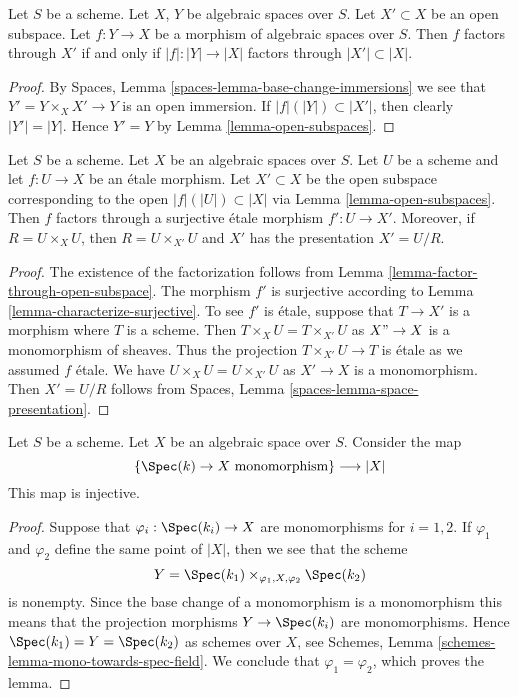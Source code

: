 \begin{lemma}
\label{lemma-factor-through-open-subspace}
Let $S$ be a scheme.
Let $X$, $Y$ be algebraic spaces over $S$.
Let $X' \subset X$ be an open subspace.
Let $f : Y \to X$ be a morphism of algebraic spaces over $S$.
Then $f$ factors through $X'$ if and only if $|f| : |Y| \to |X|$
factors through $|X'| \subset |X|$.
\end{lemma}

\begin{proof}
By Spaces, Lemma \ref{spaces-lemma-base-change-immersions}
we see that $Y' = Y \times_X X' \to Y$ is an open immersion.
If $|f|(|Y|) \subset |X'|$, then clearly $|Y'| = |Y|$. Hence $Y' = Y$ by
Lemma \ref{lemma-open-subspaces}.
\end{proof}

\begin{lemma}
\label{lemma-etale-image-open}
Let $S$ be a scheme. Let $X$ be an algebraic spaces over $S$.
Let $U$ be a scheme and let $f : U \to X$ be an \'etale morphism.
Let $X' \subset X$ be the open subspace corresponding to
the open $|f|(|U|) \subset |X|$ via
Lemma \ref{lemma-open-subspaces}.
Then $f$ factors through a surjective \'etale morphism $f' : U \to X'$.
Moreover, if $R = U \times_X U$, then $R = U \times_{X'} U$ and $X'$ has
the presentation $X' = U/R$.
\end{lemma}

\begin{proof}
The existence of the factorization follows from
Lemma \ref{lemma-factor-through-open-subspace}.
The morphism $f'$ is surjective according to
Lemma \ref{lemma-characterize-surjective}.
To see $f'$ is \'etale, suppose that $T \to X'$ is a morphism
where $T$ is a scheme. Then $T \times_X U = T \times_{X'} U$
as $X" \to X$ is a monomorphism of sheaves. Thus the projection
$T \times_{X'} U \to T$ is \'etale as we assumed $f$ \'etale.
We have $U \times_X U = U \times_{X'} U$ as $X' \to X$ is a monomorphism.
Then $X' = U/R$ follows from
Spaces, Lemma \ref{spaces-lemma-space-presentation}.
\end{proof}

\begin{lemma}
\label{lemma-points-monomorphism}
Let $S$ be a scheme. Let $X$ be an algebraic space over $S$.
Consider the map
$$
\{\Spec(k) \to X \text{ monomorphism}\}
\longrightarrow
|X|
$$
This map is injective.
\end{lemma}

\begin{proof}
Suppose that $\varphi_i : \Spec(k_i) \to X$ are monomorphisms
for $i = 1, 2$. If $\varphi_1$ and $\varphi_2$ define the same point
of $|X|$, then we see that the scheme
$$
Y = \Spec(k_1) \times_{\varphi_1, X, \varphi_2} \Spec(k_2)
$$
is nonempty. Since the base change of a monomorphism is a monomorphism
this means that the projection morphisms $Y \to \Spec(k_i)$
are monomorphisms. Hence $\Spec(k_1) = Y = \Spec(k_2)$
as schemes over $X$, see
Schemes, Lemma \ref{schemes-lemma-mono-towards-spec-field}.
We conclude that $\varphi_1 = \varphi_2$, which proves the lemma.
\end{proof}

